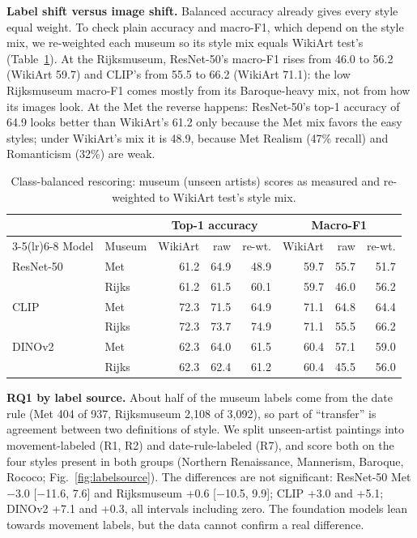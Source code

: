 \documentclass[conference]{IEEEtran}
\begin{document}
\textbf{Label shift versus image shift.} Balanced accuracy already gives every style equal weight. To check plain accuracy and macro-F1, which depend on the style mix, we re-weighted each museum so its style mix equals WikiArt test's (Table~\ref{tab:balanced}). At the Rijksmuseum, ResNet-50's macro-F1 rises from 46.0 to 56.2 (WikiArt 59.7) and CLIP's from 55.5 to 66.2 (WikiArt 71.1): the low Rijksmuseum macro-F1 comes mostly from its Baroque-heavy mix, not from how its images look. At the Met the reverse happens: ResNet-50's top-1 accuracy of 64.9 looks better than WikiArt's 61.2 only because the Met mix favors the easy styles; under WikiArt's mix it is 48.9, because Met Realism (47\% recall) and Romanticism (32\%) are weak.

\begin{table}[t]
\centering
\caption{Class-balanced rescoring: museum (unseen artists) scores as measured and re-weighted to WikiArt test's style mix.}
\label{tab:balanced}
\setlength{\tabcolsep}{3.5pt}
\begin{tabular}{llrrrrrr}
\toprule
 & & \multicolumn{3}{c}{Top-1 accuracy} & \multicolumn{3}{c}{Macro-F1} \\
\cmidrule(lr){3-5}\cmidrule(lr){6-8}
Model & Museum & WikiArt & raw & re-wt. & WikiArt & raw & re-wt. \\
\midrule
ResNet-50 & Met & 61.2 & 64.9 & 48.9 & 59.7 & 55.7 & 51.7 \\
 & Rijks & 61.2 & 61.5 & 60.1 & 59.7 & 46.0 & 56.2 \\
CLIP & Met & 72.3 & 71.5 & 64.9 & 71.1 & 64.8 & 64.4 \\
 & Rijks & 72.3 & 73.7 & 74.9 & 71.1 & 55.5 & 66.2 \\
DINOv2 & Met & 62.3 & 64.0 & 61.5 & 60.4 & 57.1 & 59.0 \\
 & Rijks & 62.3 & 62.4 & 61.2 & 60.4 & 45.5 & 56.0 \\
\bottomrule
\end{tabular}
\end{table}

\textbf{RQ1 by label source.} About half of the museum labels come from the date rule (Met 404 of 937, Rijksmuseum 2,108 of 3,092), so part of ``transfer'' is agreement between two definitions of style. We split unseen-artist paintings into movement-labeled (R1, R2) and date-rule-labeled (R7), and score both on the four styles present in both groups (Northern Renaissance, Mannerism, Baroque, Rococo; Fig.~\ref{fig:labelsource}). The differences are not significant: ResNet-50 Met $-$3.0 [$-$11.6, 7.6] and Rijksmuseum +0.6 [$-$10.5, 9.9]; CLIP +3.0 and +5.1; DINOv2 +7.1 and +0.3, all intervals including zero. The foundation models lean towards movement labels, but the data cannot confirm a real difference.
\end{document}
